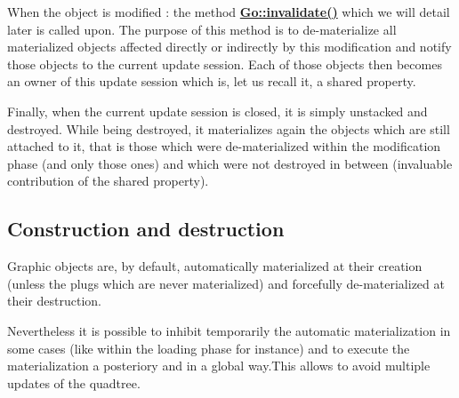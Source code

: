 When the object is modified \-: the method {\bfseries \hyperlink{classHurricane_1_1Go_a5ee451e118fe8cace16989c0f3a6d855}{Go\-::invalidate()}} which we will detail later is called upon. The purpose of this method is to de-\/materialize all materialized objects affected directly or indirectly by this modification and notify those objects to the current update session. Each of those objects then becomes an owner of this update session which is, let us recall it, a shared property.

Finally, when the current update session is closed, it is simply unstacked and destroyed. While being destroyed, it materializes again the objects which are still attached to it, that is those which were de-\/materialized within the modification phase (and only those ones) and which were not destroyed in between (invaluable contribution of the shared property).\hypertarget{classHurricane_1_1Go_secGoConstructionAndDestruction}{}\subsection{Construction and destruction}\label{classHurricane_1_1Go_secGoConstructionAndDestruction}
Graphic objects are, by default, automatically materialized at their creation (unless the plugs which are never materialized) and forcefully de-\/materialized at their destruction.

Nevertheless it is possible to inhibit temporarily the automatic materialization in some cases (like within the loading phase for instance) and to execute the materialization a posteriory and in a global way.\-This allows to avoid multiple updates of the quadtree. 

